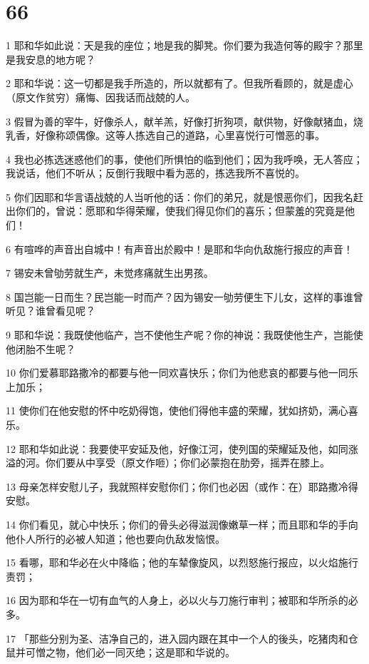 \chapter{66}

\par 1 耶和华如此说：天是我的座位；地是我的脚凳。你们要为我造何等的殿宇？那里是我安息的地方呢？
\par 2 耶和华说：这一切都是我手所造的，所以就都有了。但我所看顾的，就是虚心（原文作贫穷）痛悔、因我话而战兢的人。
\par 3 假冒为善的宰牛，好像杀人，献羊羔，好像打折狗项，献供物，好像献猪血，烧乳香，好像称颂偶像。这等人拣选自己的道路，心里喜悦行可憎恶的事。
\par 4 我也必拣选迷惑他们的事，使他们所惧怕的临到他们；因为我呼唤，无人答应；我说话，他们不听从；反倒行我眼中看为恶的，拣选我所不喜悦的。
\par 5 你们因耶和华言语战兢的人当听他的话：你们的弟兄，就是恨恶你们，因我名赶出你们的，曾说：愿耶和华得荣耀，使我们得见你们的喜乐；但蒙羞的究竟是他们！
\par 6 有喧哗的声音出自城中！有声音出於殿中！是耶和华向仇敌施行报应的声音！
\par 7 锡安未曾劬劳就生产，未觉疼痛就生出男孩。
\par 8 国岂能一日而生？民岂能一时而产？因为锡安一劬劳便生下儿女，这样的事谁曾听见？谁曾看见呢？
\par 9 耶和华说：我既使他临产，岂不使他生产呢？你的神说：我既使他生产，岂能使他闭胎不生呢？
\par 10 你们爱慕耶路撒冷的都要与他一同欢喜快乐；你们为他悲哀的都要与他一同乐上加乐；
\par 11 使你们在他安慰的怀中吃奶得饱，使他们得他丰盛的荣耀，犹如挤奶，满心喜乐。
\par 12 耶和华如此说：我要使平安延及他，好像江河，使列国的荣耀延及他，如同涨溢的河。你们要从中享受（原文作咂）；你们必蒙抱在肋旁，摇弄在膝上。
\par 13 母亲怎样安慰儿子，我就照样安慰你们；你们也必因（或作：在）耶路撒冷得安慰。
\par 14 你们看见，就心中快乐；你们的骨头必得滋润像嫩草一样；而且耶和华的手向他仆人所行的必被人知道；他也要向仇敌发恼恨。
\par 15 看哪，耶和华必在火中降临；他的车辇像旋风，以烈怒施行报应，以火焰施行责罚；
\par 16 因为耶和华在一切有血气的人身上，必以火与刀施行审判；被耶和华所杀的必多。
\par 17 「那些分别为圣、洁净自己的，进入园内跟在其中一个人的後头，吃猪肉和仓鼠并可憎之物，他们必一同灭绝；这是耶和华说的。
